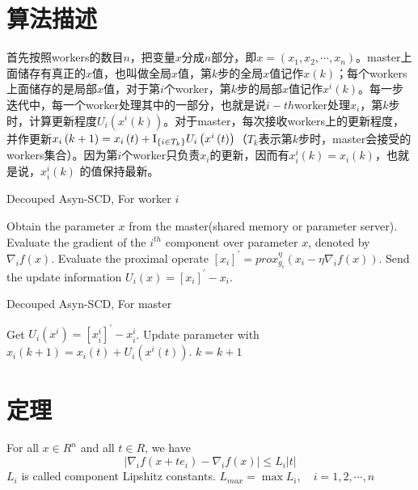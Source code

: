 \documentclass{ctexart}
\begin{document}
\section{算法描述}

首先按照workers的数目$n$，把变量$x$分成$n$部分，即$x=\left(x_1,x_2,\cdots,x_n\right)$。master上面储存有真正的$x$值，也叫做全局$x$值，第$k$步的全局$x$值记作$x\left(k\right)$；每个workers上面储存的是局部$x$值，对于第$i$个worker，第$k$步的局部$x$值记作$x^i \left(k\right)$。每一步迭代中，每一个worker处理其中的一部分，也就是说$i-th$worker处理$x_i$，第$k$步时，计算更新程度$U_i \left(x^i \left(k\right)\right)$。对于master，每次接收workers上的更新程度，并作更新${x_i}\left( {k + 1} \right) = {x_i}\left( t \right) + {{\rm I}_{\left\{ {i \in {T_k}} \right\}}}{U_i}\left( {{x^i}\left( t \right)} \right)$（$T_k$表示第$k$步时，master会接受的workers集合）。因为第$i$个worker只负责$x_i$的更新，因而有$x^i_i \left(k\right) = x_i \left(k\right)$，也就是说，$x^i_i \left(k\right)$ 的值保持最新。

\begin{algorithm}[h]
\caption{Decouped Asyn-SCD, For worker $i$}
\begin{algorithmic}[1]
    \REPEAT
    \STATE Obtain the parameter $x$ from the master(shared memory or parameter server).
    \STATE Evaluate the gradient of the $i^{th}$ component over parameter $x$, denoted by $\nabla_i f\left(x\right)$.
    \STATE Evaluate the proximal operate $\left[ x_i \right]^{'} = prox_{g_i}^\eta \left( x_i - \eta {\nabla _i}f\left( x \right) \right)$.
    \STATE Send the update information ${U_i}\left(x\right) = \left[ x_i \right]^{'} - x_i$.
\end{algorithmic}
\end{algorithm}

\begin{algorithm}[h]
\caption{Decouped Asyn-SCD, For master}
\begin{algorithmic}[1]
    \STATE Get $ {U_i}\left( {{x^i}} \right) = {\left[ {x_i^i} \right]^{'}} - x_i^i $.
    \STATE Update parameter with ${x_i}\left( {k + 1} \right) = {x_i}\left( t \right) + {U_i}\left( {{x^i}\left( t \right)} \right)$.
    \STATE $ k=k+1 $
    \ENDFOR
\end{algorithmic}
\end{algorithm}

\newpage
\section{定理}
\begin{myas}\label{as:1}
For all $x\in R^n $ and all $t\in R$, we have
    \begin{equation}\label{aseq:1}
      \left|\nabla_i f\left( x+te_i \right)-\nabla_i f\left( x\right) \right| \leq L_i \left|t\right|
    \end{equation}
    $L_i$ is called component Lipshitz constants. $L_{max}=\max L_i ,\quad i = 1,2,\cdots,n$
\end{myas}
\end{document}
